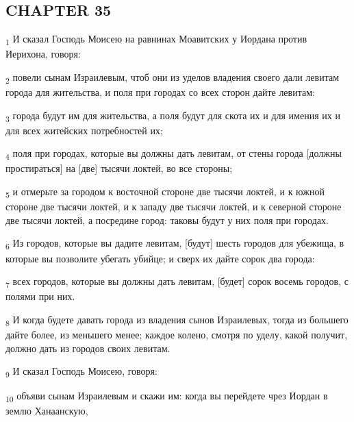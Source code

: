 \subsection{CHAPTER 35}
\begin{tcolorbox}
\textsubscript{1} И сказал Господь Моисею на равнинах Моавитских у Иордана против Иерихона, говоря:
\end{tcolorbox}
\begin{tcolorbox}
\textsubscript{2} повели сынам Израилевым, чтоб они из уделов владения своего дали левитам города для жительства, и поля при городах со всех сторон дайте левитам:
\end{tcolorbox}
\begin{tcolorbox}
\textsubscript{3} города будут им для жительства, а поля будут для скота их и для имения их и для всех житейских потребностей их;
\end{tcolorbox}
\begin{tcolorbox}
\textsubscript{4} поля при городах, которые вы должны дать левитам, от стены города [должны простираться] на [две] тысячи локтей, во все стороны;
\end{tcolorbox}
\begin{tcolorbox}
\textsubscript{5} и отмерьте за городом к восточной стороне две тысячи локтей, и к южной стороне две тысячи локтей, и к западу две тысячи локтей, и к северной стороне две тысячи локтей, а посредине город: таковы будут у них поля при городах.
\end{tcolorbox}
\begin{tcolorbox}
\textsubscript{6} Из городов, которые вы дадите левитам, [будут] шесть городов для убежища, в которые вы позволите убегать убийце; и сверх их дайте сорок два города:
\end{tcolorbox}
\begin{tcolorbox}
\textsubscript{7} всех городов, которые вы должны дать левитам, [будет] сорок восемь городов, с полями при них.
\end{tcolorbox}
\begin{tcolorbox}
\textsubscript{8} И когда будете давать города из владения сынов Израилевых, тогда из большего дайте более, из меньшего менее; каждое колено, смотря по уделу, какой получит, должно дать из городов своих левитам.
\end{tcolorbox}
\begin{tcolorbox}
\textsubscript{9} И сказал Господь Моисею, говоря:
\end{tcolorbox}
\begin{tcolorbox}
\textsubscript{10} объяви сынам Израилевым и скажи им: когда вы перейдете чрез Иордан в землю Ханаанскую,
\end{tcolorbox}
